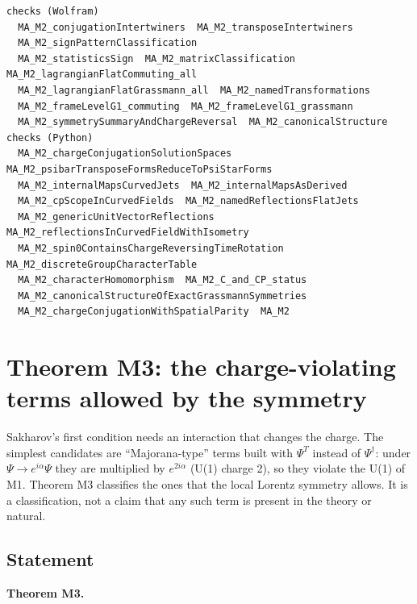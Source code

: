 \documentclass[11pt]{article}
\begin{document}
\begin{Verbatim}[fontsize=\small]
checks (Wolfram)
  MA_M2_conjugationIntertwiners  MA_M2_transposeIntertwiners
  MA_M2_signPatternClassification
  MA_M2_statisticsSign  MA_M2_matrixClassification  MA_M2_lagrangianFlatCommuting_all
  MA_M2_lagrangianFlatGrassmann_all  MA_M2_namedTransformations
  MA_M2_frameLevelG1_commuting  MA_M2_frameLevelG1_grassmann
  MA_M2_symmetrySummaryAndChargeReversal  MA_M2_canonicalStructure
checks (Python)
  MA_M2_chargeConjugationSolutionSpaces  MA_M2_psibarTransposeFormsReduceToPsiStarForms
  MA_M2_internalMapsCurvedJets  MA_M2_internalMapsAsDerived
  MA_M2_cpScopeInCurvedFields  MA_M2_namedReflectionsFlatJets
  MA_M2_genericUnitVectorReflections  MA_M2_reflectionsInCurvedFieldWithIsometry
  MA_M2_spin0ContainsChargeReversingTimeRotation  MA_M2_discreteGroupCharacterTable
  MA_M2_characterHomomorphism  MA_M2_C_and_CP_status
  MA_M2_canonicalStructureOfExactGrassmannSymmetries
  MA_M2_chargeConjugationWithSpatialParity  MA_M2
\end{Verbatim}

\section{Theorem M3: the charge-violating terms allowed by the symmetry}

Sakharov's first condition needs an interaction that changes the charge. The simplest candidates are ``Majorana-type'' terms built with $\Psi^T$ instead of $\Psi^\dagger$: under $\Psi\to e^{i\alpha}\Psi$ they are multiplied by $e^{2i\alpha}$ (U(1) charge 2), so they violate the U(1) of M1. Theorem M3 classifies the ones that the local Lorentz symmetry allows. It is a classification, not a claim that any such term is present in the theory or natural.

\subsection{Statement}

\textbf{Theorem M3.}
\end{document}
